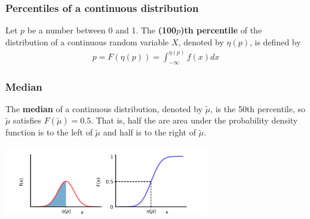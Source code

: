 \documentclass[9pt]{beamer}
\begin{document}
\begin{frame}
\frametitle{Percentiles of a continuous distribution}

\begin{definition}
Let $p$ be a number between 0 and 1. The \textbf{(100$p$)th percentile} of the distribution
of a continuous random variable $X$, denoted by $\eta(p)$, is defined by
\begin{align*}
p = F(\eta(p)) = \int_{-\infty}^{\eta(p)}f(x) dx
\end{align*}
\end{definition}


\end{frame}

\begin{frame}
\frametitle{Median}

\begin{definition}
The \textbf{median} of a continuous distribution, denoted by $\tilde{\mu}$, is the 50th percentile, so $\tilde{\mu}$ satisfies $F( \tilde{\mu}) = 0.5$. That is, half the are area under the probability density function is to the left of $\tilde{\mu}$ and half is to the right of $\tilde{\mu}$.
\end{definition}

\center \includegraphics[height=3cm]{images/median.png}

\end{frame}
\end{document}
